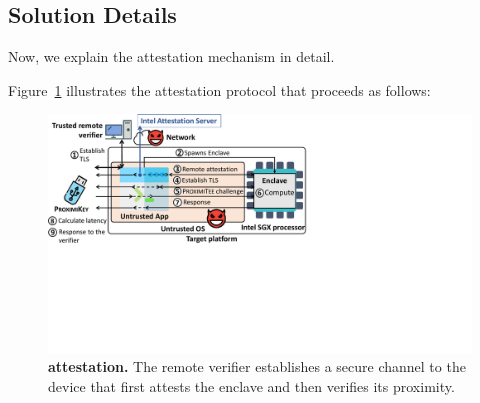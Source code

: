 \subsection{Solution Details}
\label{sec:systemDesign}


Now, we explain the \name attestation mechanism in detail.



Figure~\ref{fig:systemSetUp} illustrates the attestation protocol that proceeds as follows:


\begin{figure}[t]
 \centering
  \includegraphics[trim={0 8.7cm 13.2cm 0},clip,width=\linewidth]{chapters/ProximiTEE/figures/proximiteeMain.pdf}
 \caption[\name attestation]{\textbf{\name attestation.} The remote verifier establishes a secure channel to the \device device that first attests the enclave and then verifies its proximity.}
 	\label{fig:systemSetUp}
\end{figure}


